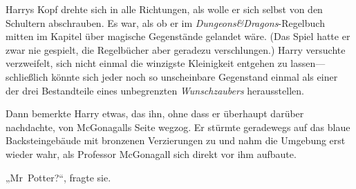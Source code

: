 Harrys Kopf drehte sich in alle Richtungen, als wolle er sich selbst von den Schultern abschrauben. Es war, als ob er im \emph{Dungeons\&Dragons}-Regelbuch mitten im Kapitel über magische Gegenstände gelandet wäre. (Das Spiel hatte er zwar nie gespielt, die Regelbücher aber geradezu verschlungen.) Harry versuchte verzweifelt, sich nicht einmal die winzigste Kleinigkeit entgehen zu lassen—schließlich könnte sich jeder noch so unscheinbare Gegenstand einmal als einer der drei Bestandteile eines unbegrenzten \emph{Wunschzaubers} herausstellen.

Dann bemerkte Harry etwas, das ihn, ohne dass er überhaupt darüber nachdachte, von McGonagalls Seite wegzog. Er stürmte geradewegs auf das blaue Backsteingebäude mit bronzenen Verzierungen zu und nahm die Umgebung erst wieder wahr, als Professor McGonagall sich direkt vor ihm aufbaute.

„Mr~Potter?“, fragte sie.

